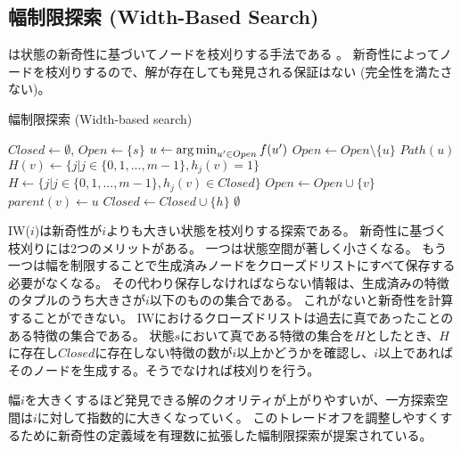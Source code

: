\subsection{幅制限探索 (Width-Based Search)}
\label{sec:width-based-search}

は状態の新奇性に基づいてノードを枝刈りする手法である \cite{lipovetzkyg12}。
新奇性によってノードを枝刈りするので、解が存在しても発見される保証はない (完全性を満たさない)。

\begin{algorithm}[tbh]
\caption{幅制限探索 (Width-based search)}
\label{alg:width-based-search}
	$Closed \leftarrow \emptyset$, $Open \leftarrow \{s\}$\;
	 {
                $u \leftarrow \operatorname*{arg\,min}_{u' \in Open} f(u')$ \;
		$Open \leftarrow Open \setminus \{u\} $\;
		 {
			\Return $Path(u)$\;
		}
		 {
                  $H(v) \leftarrow \{j | j \in \{0, 1, ..., m-1\}, h_j(v) = 1\}$\;
                  $H \leftarrow \{j | j \in \{0, 1, ..., m-1\}, h_j(v) \in Closed\}$\;
                   {
                    $Open \leftarrow Open \cup \{v\}$\;
                    $parent(v) \leftarrow u$\;
                  }
                   {
                    $Closed \leftarrow Closed \cup \{h\}$\;
                  }
		}
 	}
	\Return $\emptyset$\;
\end{algorithm}

IW($i$)は新奇性が$i$よりも大きい状態を枝刈りする探索である。
新奇性に基づく枝刈りには2つのメリットがある。
一つは状態空間が著しく小さくなる。
もう一つは幅を制限することで生成済みノードをクローズドリストにすべて保存する必要がなくなる。
その代わり保存しなければならない情報は、生成済みの特徴のタプルのうち大きさが$i$以下のものの集合である。
これがないと新奇性を計算することができない。
IWにおけるクローズドリストは過去に真であったことのある特徴の集合である。
状態$s$において真である特徴の集合を$H$としたとき、$H$に存在し$Closed$に存在しない特徴の数が$i$以上かどうかを確認し、$i$以上であればそのノードを生成する。そうでなければ枝刈りを行う。

幅$i$を大きくするほど発見できる解のクオリティが上がりやすいが、一方探索空間は$i$に対して指数的に大きくなっていく。
このトレードオフを調整しやすくするために新奇性の定義域を有理数に拡張した幅制限探索が提案されている\cite{geffner2015}。


